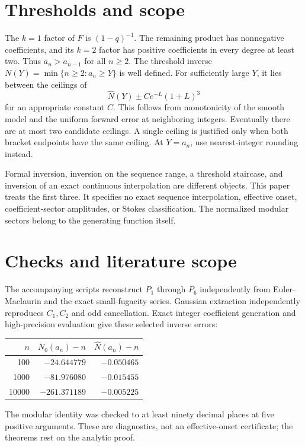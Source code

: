 \documentclass[11pt]{article}
\theoremstyle{definition}
\theoremstyle{plain}
\begin{document}
\section{Thresholds and scope}
The $k=1$ factor of $F$ is $(1-q)^{-1}$. The remaining product has
nonnegative coefficients, and its $k=2$ factor has positive coefficients
in every degree at least two. Thus $a_n>a_{n-1}$ for all $n\ge2$.
The threshold inverse $N(Y)=\min\{n\ge2:a_n\ge Y\}$ is well defined.
For sufficiently large $Y$, it lies between the ceilings of
\[
 \widehat N(Y)\pm Ce^{-L}(1+L)^3
\]
for an appropriate constant $C$. This follows from monotonicity of the
smooth model and the uniform forward error at neighboring integers.
Eventually there are at most two candidate ceilings. A single ceiling
is justified only when both bracket endpoints have the same ceiling.
At $Y=a_n$, use nearest-integer rounding instead.

Formal inversion, inversion on the sequence range, a threshold staircase,
and inversion of an exact continuous interpolation are different objects.
This paper treats the first three. It specifies no exact sequence
interpolation, effective onset, coefficient-sector amplitudes, or Stokes
classification. The normalized modular sectors belong to the generating
function itself.

\section{Checks and literature scope}
The accompanying scripts reconstruct $P_1$ through $P_6$ independently
from Euler--Maclaurin and the exact small-fugacity series. Gaussian
extraction independently reproduces $C_1,C_2$ and odd cancellation.
Exact integer coefficient generation and high-precision evaluation give
these selected inverse errors:
\begin{center}
\begin{tabular}{rrr}\toprule
$n$ & $N_0(a_n)-n$ & $\widehat N(a_n)-n$\\\midrule
100 & $-24.644779$ & $-0.050465$\\
1000 & $-81.976080$ & $-0.015455$\\
10000 & $-261.371189$ & $-0.005225$\\\bottomrule
\end{tabular}
\end{center}
The modular identity was checked to at least ninety decimal places at
five positive arguments. These are diagnostics, not an effective-onset
certificate; the theorems rest on the analytic proof.
\end{document}

